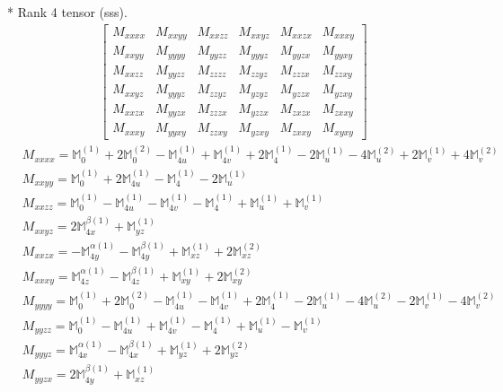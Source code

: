 \documentclass[fleqn,8pt,landscape]{jsarticle}
\begin{document}
* Rank 4 tensor (sss).
\begin{align*}
\begin{bmatrix} M_{xxxx} & M_{xxyy} & M_{xxzz} & M_{xxyz} & M_{xxzx} & M_{xxxy} \\ M_{xxyy} & M_{yyyy} & M_{yyzz} & M_{yyyz} & M_{yyzx} & M_{yyxy} \\ M_{xxzz} & M_{yyzz} & M_{zzzz} & M_{zzyz} & M_{zzzx} & M_{zzxy} \\ M_{xxyz} & M_{yyyz} & M_{zzyz} & M_{yzyz} & M_{yzzx} & M_{yzxy} \\ M_{xxzx} & M_{yyzx} & M_{zzzx} & M_{yzzx} & M_{zxzx} & M_{zxxy} \\ M_{xxxy} & M_{yyxy} & M_{zzxy} & M_{yzxy} & M_{zxxy} & M_{xyxy} \end{bmatrix}
\end{align*}
\begin{align*}
& M_{xxxx} = \mathbb{M}_{0}^{(1)} + 2 \mathbb{M}_{0}^{(2)} - \mathbb{M}_{4u}^{(1)} + \mathbb{M}_{4v}^{(1)} + 2 \mathbb{M}_{4}^{(1)} - 2 \mathbb{M}_{u}^{(1)} - 4 \mathbb{M}_{u}^{(2)} + 2 \mathbb{M}_{v}^{(1)} + 4 \mathbb{M}_{v}^{(2)} \\
& M_{xxyy} = \mathbb{M}_{0}^{(1)} + 2 \mathbb{M}_{4u}^{(1)} - \mathbb{M}_{4}^{(1)} - 2 \mathbb{M}_{u}^{(1)} \\
& M_{xxzz} = \mathbb{M}_{0}^{(1)} - \mathbb{M}_{4u}^{(1)} - \mathbb{M}_{4v}^{(1)} - \mathbb{M}_{4}^{(1)} + \mathbb{M}_{u}^{(1)} + \mathbb{M}_{v}^{(1)} \\
& M_{xxyz} = 2 \mathbb{M}_{4x}^{\beta(1)} + \mathbb{M}_{yz}^{(1)} \\
& M_{xxzx} = - \mathbb{M}_{4y}^{\alpha(1)} - \mathbb{M}_{4y}^{\beta(1)} + \mathbb{M}_{xz}^{(1)} + 2 \mathbb{M}_{xz}^{(2)} \\
& M_{xxxy} = \mathbb{M}_{4z}^{\alpha(1)} - \mathbb{M}_{4z}^{\beta(1)} + \mathbb{M}_{xy}^{(1)} + 2 \mathbb{M}_{xy}^{(2)} \\
& M_{yyyy} = \mathbb{M}_{0}^{(1)} + 2 \mathbb{M}_{0}^{(2)} - \mathbb{M}_{4u}^{(1)} - \mathbb{M}_{4v}^{(1)} + 2 \mathbb{M}_{4}^{(1)} - 2 \mathbb{M}_{u}^{(1)} - 4 \mathbb{M}_{u}^{(2)} - 2 \mathbb{M}_{v}^{(1)} - 4 \mathbb{M}_{v}^{(2)} \\
& M_{yyzz} = \mathbb{M}_{0}^{(1)} - \mathbb{M}_{4u}^{(1)} + \mathbb{M}_{4v}^{(1)} - \mathbb{M}_{4}^{(1)} + \mathbb{M}_{u}^{(1)} - \mathbb{M}_{v}^{(1)} \\
& M_{yyyz} = \mathbb{M}_{4x}^{\alpha(1)} - \mathbb{M}_{4x}^{\beta(1)} + \mathbb{M}_{yz}^{(1)} + 2 \mathbb{M}_{yz}^{(2)} \\
& M_{yyzx} = 2 \mathbb{M}_{4y}^{\beta(1)} + \mathbb{M}_{xz}^{(1)} \\

\end{align*}
\end{document}

